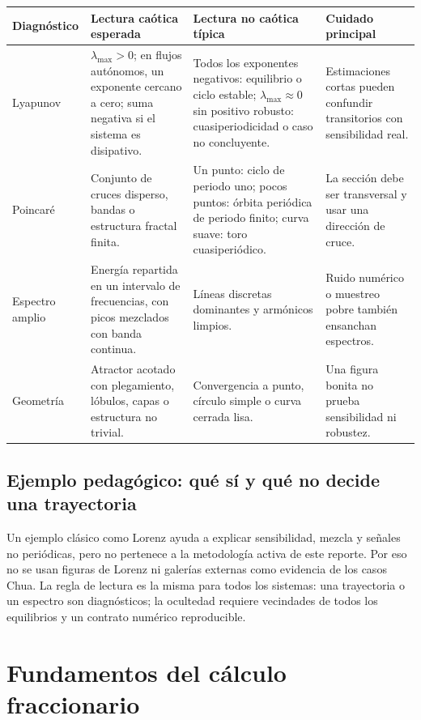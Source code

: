 \documentclass[11pt]{article}
\begin{document}
\begin{center}
\footnotesize
\begin{longtable}{@{}L{0.18\textwidth}L{0.30\textwidth}L{0.23\textwidth}L{0.20\textwidth}@{}}
\toprule
Diagnóstico & Lectura caótica esperada & Lectura no caótica típica & Cuidado principal \\
\midrule
Lyapunov & \(\lambda_{\max}>0\); en flujos autónomos, un exponente cercano a cero; suma negativa si el sistema es disipativo. & Todos los exponentes negativos: equilibrio o ciclo estable; \(\lambda_{\max}\approx0\) sin positivo robusto: cuasiperiodicidad o caso no concluyente. & Estimaciones cortas pueden confundir transitorios con sensibilidad real. \\
Poincaré & Conjunto de cruces disperso, bandas o estructura fractal finita. & Un punto: ciclo de periodo uno; pocos puntos: órbita periódica de periodo finito; curva suave: toro cuasiperiódico. & La sección debe ser transversal y usar una dirección de cruce. \\
Espectro amplio & Energía repartida en un intervalo de frecuencias, con picos mezclados con banda continua. & Líneas discretas dominantes y armónicos limpios. & Ruido numérico o muestreo pobre también ensanchan espectros. \\
Geometría & Atractor acotado con plegamiento, lóbulos, capas o estructura no trivial. & Convergencia a punto, círculo simple o curva cerrada lisa. & Una figura bonita no prueba sensibilidad ni robustez. \\
\bottomrule
\end{longtable}
\end{center}

\subsection{Ejemplo pedagógico: qué sí y qué no decide una trayectoria}

Un ejemplo clásico como Lorenz ayuda a explicar sensibilidad, mezcla y señales no periódicas, pero no pertenece a la metodología activa de este reporte. Por eso no se usan figuras de Lorenz ni galerías externas como evidencia de los casos Chua. La regla de lectura es la misma para todos los sistemas: una trayectoria o un espectro son diagnósticos; la ocultedad requiere vecindades de todos los equilibrios y un contrato numérico reproducible.
\section{Fundamentos del cálculo fraccionario}
\label{sec:fundamentos-calculo-fraccionario}
\end{document}
